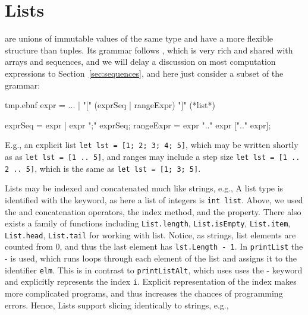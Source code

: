 \section{Lists}
 are unions of immutable values of the same type and have a more flexible structure than tuples. Its grammar follows , which is very rich and shared with arrays and sequences, and we will delay a discussion on most computation expressions to Section~\ref{sec:sequences}, and here just consider a subset of the grammar:
\begin{verbatimwrite}{tmp.ebnf}
expr = ... 
  | "[" (exprSeq | rangeExpr) "]" (*list*)

exprSeq =  expr | expr ";" exprSeq;
rangeExpr = expr ".." expr [".." expr];
\end{verbatimwrite}
E.g., an explicit list \mbox{\lstinline!let lst = [1; 2; 3; 4; 5]!}, which may be written shortly as  as \mbox{\lstinline!let lst = [1 .. 5]!}, and ranges may include a step size \mbox{\lstinline!let lst = [1 .. 2 .. 5]!}, which is the same as \mbox{\lstinline!let lst = [1; 3; 5]!}.

Lists may be indexed and concatenated much like strings, e.g.,
%
%
A list type is identified with the  keyword, as here a list of integers is \lstinline!int list!. Above, we used the  and \idx{\lexeme{::}} concatenation operators, the  index method, and the  property. There also exists a family of functions including \lstinline!List.length!, \lstinline!List.isEmpty!, \lstinline!List.item!, \lstinline!List.head!, \lstinline!List.tail! for working with list. Notice, as strings, list elements are counted from 0, and thus the last element has \lstinline!lst.Length - 1!. In \lstinline!printList! the - is used, which runs loops through each element of the list and assigns it to the identifier \lstinline!elm!. This is in contrast to \lstinline!printListAlt!, which uses uses the - keyword and explicitly represents the index \lstinline!i!. Explicit representation of the index makes more complicated programs, and thus increases the chances of programming errors. Hence,  Lists support slicing identically to strings, e.g.,
%
%

